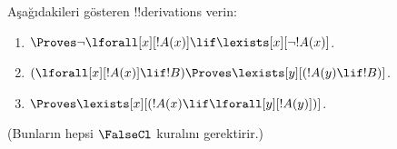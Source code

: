 \documentclass[../../../include/open-logic-section]{subfiles}
\begin{document}
\begin{prob}
Aşağıdakileri gösteren !!{derivation}s verin:
\begin{enumerate}
\item $\Proves \lnot\lforall[x][!A(x)] \lif \lexists[x][\lnot!A(x)]$.
\item $(\lforall[x][!A(x)] \lif !B) \Proves \lexists[y][(!A(y) \lif !B)]$.
\item $\Proves \lexists[x][(!A(x) \lif \lforall[y][!A(y)])]$.
\end{enumerate}
(Bunların hepsi $\FalseCl$ kuralını gerektirir.)
\end{prob}
\end{document}
